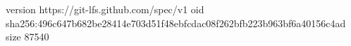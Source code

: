 version https://git-lfs.github.com/spec/v1
oid sha256:496c647b682be28414e703d51f48ebfcdac08f262bfb223b963bf6a40156c4ad
size 87540

